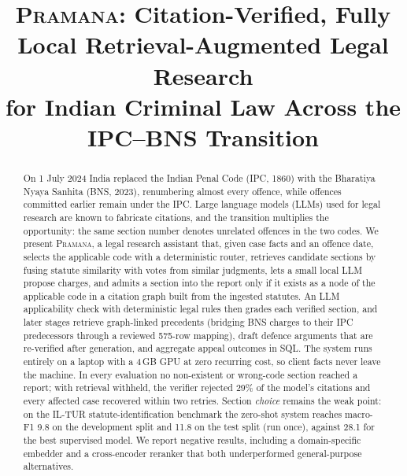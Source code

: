 \documentclass[conference]{IEEEtran}
\newcommand{\sys}{\textsc{Pramana}\xspace}
\newcommand{\testmacro}{11.8}
\begin{document}
\title{\sys: Citation-Verified, Fully Local Retrieval-Augmented Legal Research\\for Indian Criminal Law Across the IPC--BNS Transition}

\author{
}

\maketitle

\begin{abstract}
On 1 July 2024 India replaced the Indian Penal Code (IPC, 1860) with the Bharatiya Nyaya Sanhita (BNS, 2023), renumbering almost every offence, while offences committed earlier remain under the IPC. Large language models (LLMs) used for legal research are known to fabricate citations, and the transition multiplies the opportunity: the same section number denotes unrelated offences in the two codes. We present \sys, a legal research assistant that, given case facts and an offence date, selects the applicable code with a deterministic router, retrieves candidate sections by fusing statute similarity with votes from similar judgments, lets a small local LLM propose charges, and admits a section into the report only if it exists as a node of the applicable code in a citation graph built from the ingested statutes. An LLM applicability check with deterministic legal rules then grades each verified section, and later stages retrieve graph-linked precedents (bridging BNS charges to their IPC predecessors through a reviewed 575-row mapping), draft defence arguments that are re-verified after generation, and aggregate appeal outcomes in SQL. The system runs entirely on a laptop with a 4\,GB GPU at zero recurring cost, so client facts never leave the machine. In every evaluation no non-existent or wrong-code section reached a report; with retrieval withheld, the verifier rejected 29\% of the model's citations and every affected case recovered within two retries. Section \emph{choice} remains the weak point: on the IL-TUR statute-identification benchmark the zero-shot system reaches macro-F1 9.8 on the development split and \testmacro{} on the test split (run once), against 28.1 for the best supervised model. We report negative results, including a domain-specific embedder and a cross-encoder reranker that both underperformed general-purpose alternatives.
\end{abstract}
\end{document}
